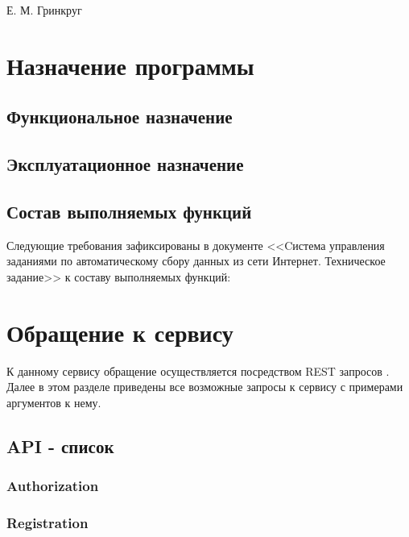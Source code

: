 \documentclass[a4paper,12pt]{article}
\begin{document}
	{Е. М. Гринкруг}
	
	\firstPage
						\newpage
	\secondPage
						\newpage
	\thirdPage
						\newpage
	\section{Назначение программы}
	\subsection{Функциональное назначение}
	
	\subsection{Эксплуатационное назначение}
	
	\subsection{Состав выполняемых функций}
	Следующие требования зафиксированы в документе <<Cистема управления заданиями по автоматическому сбору данных из сети Интернет. Техническое задание>> к составу выполняемых функций:
	
	\newpage
	
	\section{Обращение к сервису}
    
    К данному сервису обращение осуществляется посредством REST запросов \cite{rest}. Далее в этом разделе приведены все возможные запросы к сервису с примерами аргументов к нему.
    
	\subsection{API - список}
	
	
	\subsubsection{Authorization}
	
	
	\subsubsection{Registration}
	
	
\end{document}
